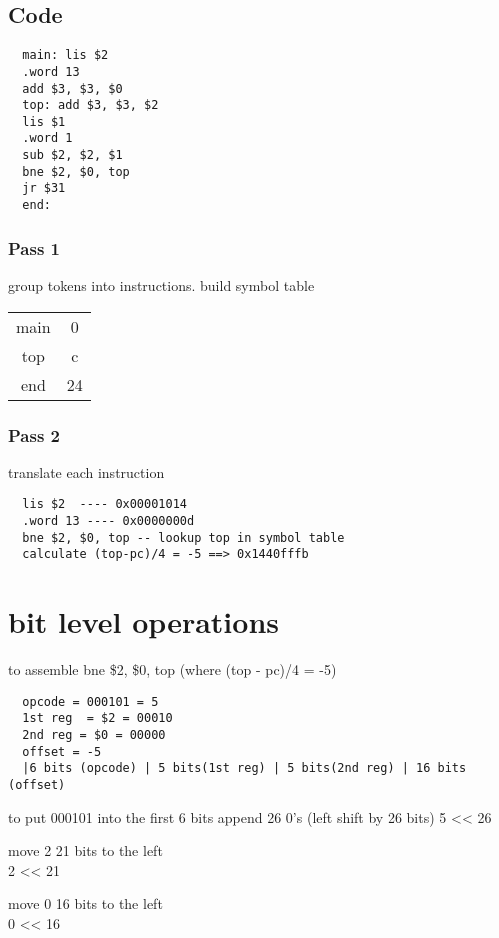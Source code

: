 \documentclass[11pt]{amsart}
\begin{document}
\subsection{Code}
\begin{verbatim}
  main: lis $2
  .word 13
  add $3, $3, $0
  top: add $3, $3, $2
  lis $1
  .word 1
  sub $2, $2, $1
  bne $2, $0, top
  jr $31
  end:
\end{verbatim}
\subsubsection{Pass 1}
\par group tokens into instructions. build symbol table
\begin {tabular}{|c c|}
  \hline
  main &  0\\
  top & c\\
  end  & 24\\
  \hline
\end{tabular}

\subsubsection{Pass 2}
\par translate each instruction
\begin{verbatim}
  lis $2  ---- 0x00001014
  .word 13 ---- 0x0000000d
  bne $2, $0, top -- lookup top in symbol table
  calculate (top-pc)/4 = -5 ==> 0x1440fffb
\end{verbatim}
\section{bit level operations}
\par to assemble bne \$2, \$0, top (where (top - pc)/4  = -5)
\begin{verbatim}
  opcode = 000101 = 5
  1st reg  = $2 = 00010
  2nd reg = $0 = 00000
  offset = -5
  |6 bits (opcode) | 5 bits(1st reg) | 5 bits(2nd reg) | 16 bits (offset)
\end{verbatim}
\par to put 000101 into the first 6 bits append 26 0's (left shift by 26 bits)
5 << 26\\

\par move 2 21 bits to the left\\ 2 << 21
\par move 0 16 bits to the left\\0 << 16
\end{document}
